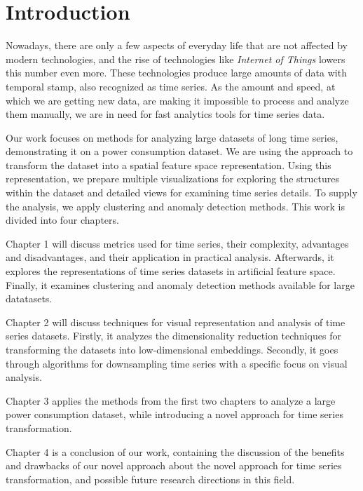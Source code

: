 \chapter*{Introduction}
Nowadays, there are only a few aspects of everyday life that are not affected by modern technologies, and the rise of technologies like \textit{Internet of Things} lowers this number even more. These technologies produce large amounts of data with temporal stamp, also recognized as time series. As the amount and speed, at which we are getting new data, are making it impossible to process and analyze them manually, we are in need for fast analytics tools for time series data.

Our work focuses on methods for analyzing large datasets of long time series, demonstrating it on a power consumption dataset.  We are using the approach to transform the dataset into a spatial feature space representation. Using this representation, we prepare multiple visualizations for exploring the structures within the dataset and detailed views for examining time series details. To supply the analysis, we apply clustering and anomaly detection methods. This work is divided into four chapters.

Chapter 1 will discuss metrics used for time series, their complexity, advantages and disadvantages, and their application in practical analysis. Afterwards, it explores the representations of time series datasets in artificial feature space. Finally, it examines clustering and anomaly detection methods available for large datatasets.

Chapter 2 will discuss techniques for visual representation and analysis of time series datasets. Firstly, it analyzes the dimensionality reduction techniques for transforming the datasets into low-dimensional embeddings. Secondly, it goes through algorithms for downsampling time series with a specific focus on visual analysis.

Chapter 3 applies the methods from the first two chapters to analyze a large power consumption dataset, while introducing a novel approach for time series transformation.

Chapter 4 is a conclusion of our work, containing the discussion of the benefits and drawbacks of our novel approach about the novel approach for time series transformation, and possible future research directions in this field.